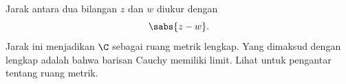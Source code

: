 
Jarak antara dua bilangan $z$ dan $w$ diukur dengan
\begin{equation*}
\sabs{z-w} .
\end{equation*}
Jarak ini menjadikan $\C$ sebagai ruang metrik lengkap.
Yang dimaksud dengan lengkap adalah bahwa barisan Cauchy memiliki limit.
Lihat 
untuk pengantar tentang ruang metrik.
